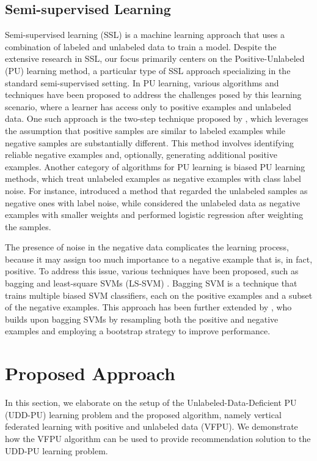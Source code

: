 \documentclass[10pt,journal,compsoc]{IEEEtran}
\begin{document}
\subsection{Semi-supervised Learning}
Semi-supervised learning (SSL) is a machine learning approach that uses a combination of labeled and unlabeled data to train a model. Despite the extensive research in SSL, our focus primarily centers on the Positive-Unlabeled (PU) learning method, a particular type of SSL approach specializing in the standard semi-supervised setting. In PU learning, various algorithms and techniques have been proposed to address the challenges posed by this learning scenario, where a learner has access only to positive examples and unlabeled data. One such approach is the two-step technique proposed by \citet{liu2003building}, which leverages the assumption that positive samples are similar to labeled examples while negative samples are substantially different. This method involves identifying reliable negative examples and, optionally, generating additional positive examples. Another category of algorithms for PU learning is biased PU learning methods, which treat unlabeled examples as negative examples with class label noise. For instance, \citet{liu2015classification} introduced a method that regarded the unlabeled samples as negative ones with label noise, while \citet{liu2003building} considered the unlabeled data as negative examples with smaller weights and performed logistic regression after weighting the samples.

The presence of noise in the negative data complicates the learning process, because it may assign too much importance to a negative example that is, in fact, positive. To address this issue, various techniques have been proposed, such as bagging and least-square SVMs (LS-SVM) \cite{suykens1999least}. Bagging SVM is a technique that trains multiple biased SVM classifiers, each on the positive examples and a subset of the negative examples. This approach has been further extended by \citet{mordelet2014bagging}, who builds upon bagging SVMs by resampling both the positive and negative examples and employing a bootstrap strategy to improve performance.

\section{Proposed Approach}
\label{sec3}
	In this section, we elaborate on the setup of the Unlabeled-Data-Deficient PU (UDD-PU) learning problem and the proposed algorithm, namely vertical federated learning with positive and unlabeled data (VFPU). We demonstrate how the VFPU algorithm can be used to provide recommendation solution to the UDD-PU learning problem.
\end{document}

